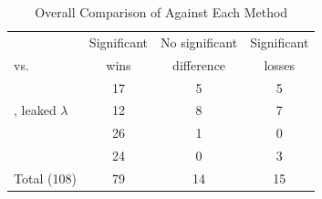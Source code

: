 \begin{table}[t]
\centering
\caption{Overall Comparison of \fado{} Against Each Method}
\label{tab:overall}
\setlength{\tabcolsep}{4pt}
\footnotesize
\begin{tabular}{@{}l ccc@{}}
\toprule
& Significant & No significant & Significant \\
\fado{} vs. & wins & difference & losses \\
\midrule
\ara{} & 17 & 5 & 5 \\
\ara{}, leaked $\lambda$ & 12 & 8 & 7 \\
\arf{} & 26 & 1 & 0 \\
\rfr{} & 24 & 0 & 3 \\
\midrule
Total (108) & 79 & 14 & 15 \\
\bottomrule
\end{tabular}
\end{table}
